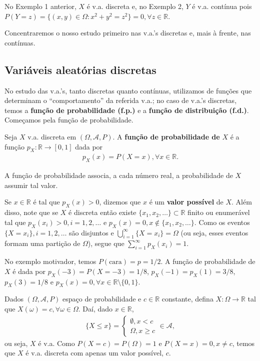 \documentclass[../Notas.tex]{subfiles}
\begin{document}
\begin{example}
No Exemplo 1 anterior, $X$ é v.a. discreta e, no Exemplo 2, $Y$ é v.a. contínua pois $P(Y=z) = \{ (x,y)\in\Omega : x^2 + y^2 = z^2 \} = 0, \forall z\in\mathbb{R}$.
\end{example}

Concentraremos o nosso estudo primeiro nas v.a.'s discretas e, mais à frente, nas contínuas.

\subsection{Variáveis aleatórias discretas}
No estudo das v.a.'s, tanto discretas quanto contínuas, utilizamos de funções que determinam o ``comportamento'' da referida v.a.; no caso de v.a.'s discretas, temos a \textbf{função de probabilidade (f.p.)} e a \textbf{função de distribuição (f.d.)}. Começamos pela função de probabilidade.
\begin{definition}
Seja $X$ v.a. discreta em $(\Omega, \mathcal{A}, P)$. A \textbf{função de probabilidade de } $X$ é a função $p_X:\mathbb{R}\to [0,1]$ dada por
\begin{align*}
    p_X(x) = P(X=x), \forall x\in\mathbb{R}.
\end{align*}
\end{definition}
A função de probabilidade associa, a cada número real, a probabilidade de $X$ assumir tal valor.
\begin{remark}
Se $x\in\mathbb{R}$ é tal que $p_X(x) > 0$, dizemos que $x$ é um \textbf{valor possível} de $X$. Além disso, note que se $X$ é discreta então existe $\{ x_1, x_2, \dots \}\subset\mathbb{R}$ finito ou enumerável tal que $p_X(x_i) > 0, i=1,2,\dots$ e $p_X(x) = 0, x\notin\{x_1, x_2, \dots\}$. Como os eventos $\{X = x_i\}, i=1, 2, \dots$ são disjuntos e $\displaystyle{ \bigcup_{i=1}^{\infty} \{X=x_i\} = \Omega}$ (ou seja, esses eventos formam uma partição de $\Omega$), segue que $\displaystyle{ \sum_{i=1}^{\infty}p_X(x_i) = 1 }$.
\end{remark}

\begin{example}
No exemplo motivador, temos $P(\text{cara}) = p = 1/2$. A função de probabilidade de $X$ é dada por $p_X(-3) = P(X=-3) = 1/8$, $p_X(-1) = p_X(1) = 3/8$, $p_X(3) = 1/8$ e $p_X(x) = 0, \forall x\in\mathbb{R}\setminus\{0,1\}$.
\end{example}

\begin{example}
Dados $(\Omega, \mathcal{A}, P)$ espaço de probabilidade e $c\in\mathbb{R}$ constante, defina $X:\Omega\to\mathbb{R}$ tal que $X(\omega) = c, \forall\omega\in\Omega$. Daí, dado $x\in\mathbb{R}$,
\begin{align*}
    \{X\leq x\} = \begin{cases}
    \emptyset, x < c \\
    \Omega, x\geq c
    \end{cases}\in\mathcal{A},
\end{align*}
ou seja, $X$ é v.a. Como $P(X=c) = P(\Omega) = 1$ e $P(X=x) = 0, x\neq c$, temos que $X$ é v.a. discreta com apenas um valor possível, $c$.
\end{example}
\end{document}
